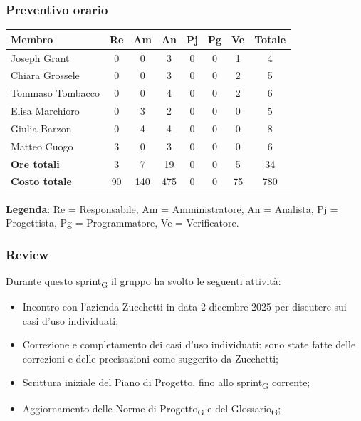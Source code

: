 \documentclass[11pt,a4paper]{article}
\newcommand{\gls}[1]{#1\textsubscript{G}}
\begin{document}
\subsubsection{Preventivo orario}
\begin{center}
    \begin{tabular}{|l|c|c|c|c|c|c|c|}
        \hline
        \textbf{Membro} & \textbf{Re} & \textbf{Am} & \textbf{An} & \textbf{Pj} & \textbf{Pg} & \textbf{Ve} & \textbf{Totale} \\
        \hline
        Joseph Grant & 0 & 0 & 3 & 0 & 0 & 1 & 4 \\
        \hline
        Chiara Grossele & 0 & 0 & 3 & 0 & 0 & 2 & 5 \\
        \hline
        Tommaso Tombacco & 0 & 0 & 4 & 0 & 0 & 2 & 6 \\
        \hline
        Elisa Marchioro & 0 & 3 & 2 & 0 & 0 & 0 & 5 \\
        \hline
        Giulia Barzon & 0 & 4 & 4 & 0 & 0 & 0 & 8 \\
        \hline
        Matteo Cuogo & 3 & 0 & 3 & 0 & 0 & 0 & 6 \\
        \hline
        \textbf{Ore totali} & 3 & 7 & 19 & 0 & 0 & 5 & 34 \\
        \hline
        \textbf{Costo totale} & 90 & 140 & 475 & 0 & 0 & 75 & 780 \\
        \hline
    \end{tabular}
\end{center}

\noindent \textbf{Legenda}: Re = Responsabile, Am = Amministratore, An = Analista, Pj = Progettista, Pg = Programmatore, Ve = Verificatore.

\subsubsection{Review}
Durante questo \gls{sprint} il gruppo ha svolto le seguenti attività:
 \begin{itemize}
        \item Incontro con l'azienda Zucchetti in data 2 dicembre 2025 per discutere sui casi d'uso individuati;
        \item Correzione e completamento dei casi d'uso individuati: sono state fatte delle correzioni e delle precisazioni come suggerito da Zucchetti;
        \item Scrittura iniziale del Piano di Progetto, fino allo \gls{sprint} corrente;
        \item Aggiornamento delle \gls{Norme di Progetto} e del \gls{Glossario};
    \end{itemize}
\end{document}
